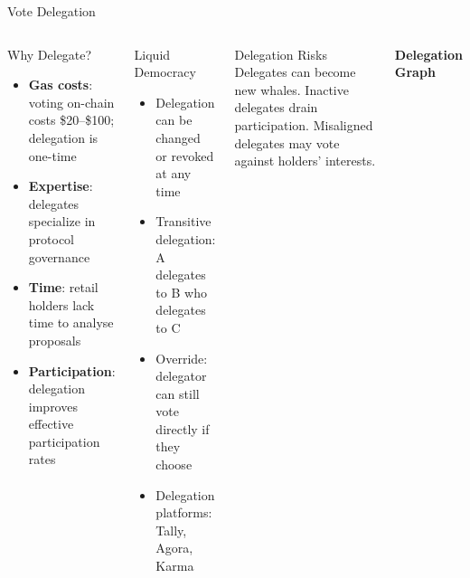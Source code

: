 \documentclass[8pt,aspectratio=169]{beamer}
\begin{document}
\begin{frame}{Vote Delegation}
\begin{columns}[T]
\begin{block}{Why Delegate?}
\footnotesize
\begin{itemize}
  \item \textbf{Gas costs}: voting on-chain costs \$20--\$100; delegation is one-time
  \item \textbf{Expertise}: delegates specialize in protocol governance
  \item \textbf{Time}: retail holders lack time to analyse proposals
  \item \textbf{Participation}: delegation improves effective participation rates
\end{itemize}
\end{block}
\vspace{2mm}
\begin{block}{Liquid Democracy}
\footnotesize
\begin{itemize}
  \item Delegation can be changed or revoked at any time
  \item Transitive delegation: A delegates to B who delegates to C
  \item Override: delegator can still vote directly if they choose
  \item Delegation platforms: Tally, Agora, Karma
\end{itemize}
\end{block}
\vspace{2mm}
\begin{alertblock}{Delegation Risks}
\footnotesize
Delegates can become new whales. Inactive delegates drain participation. Misaligned delegates may vote against holders' interests.
\end{alertblock}

\vspace{2mm}
\begin{center}
\textbf{\small Delegation Graph}
\end{center}
\end{columns}
\end{frame}
\end{document}
